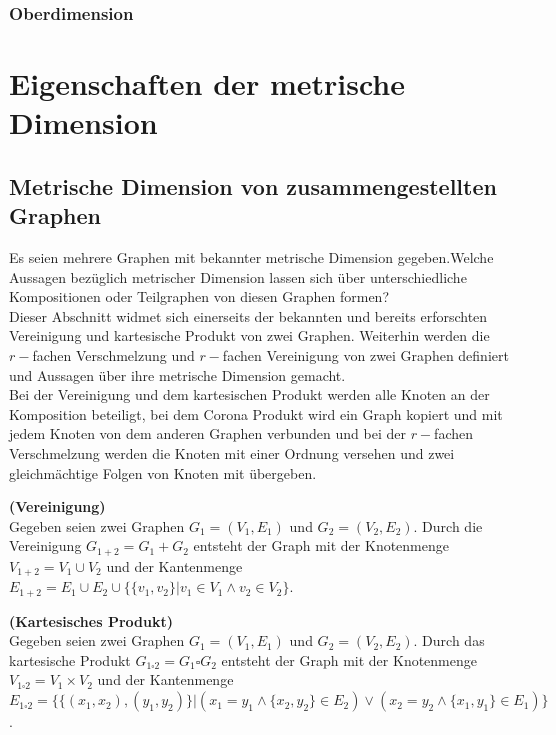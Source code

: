 \subsection{Oberdimension}


\chapter{Eigenschaften der metrische Dimension}
\section{Metrische Dimension von zusammengestellten Graphen}
\label{kapallg}
Es seien mehrere Graphen mit bekannter metrische Dimension gegeben.\newline Welche Aussagen bezüglich metrischer Dimension lassen sich über unterschiedliche Kompositionen oder Teilgraphen von diesen Graphen formen?\\Dieser Abschnitt widmet sich einerseits der bekannten und bereits erforschten Vereinigung und kartesische Produkt von zwei Graphen. Weiterhin werden die $r-$fachen Verschmelzung und $r-$fachen Vereinigung von zwei Graphen definiert und Aussagen über ihre metrische Dimension gemacht.\\Bei der Vereinigung und dem kartesischen Produkt werden alle Knoten an der Komposition beteiligt, bei dem Corona Produkt wird ein Graph kopiert und mit jedem Knoten von dem anderen Graphen verbunden und bei der $r-$fachen Verschmelzung werden die Knoten mit einer Ordnung versehen und zwei gleichmächtige Folgen von Knoten mit übergeben.   
\begin{defi}{\textbf{(Vereinigung)}}\\
Gegeben seien zwei Graphen $G_1=(V_1,E_1)$ und $G_2=(V_2,E_2)$. Durch die Vereinigung $G_{1+2}=G_1+G_2$ entsteht der Graph mit der Knotenmenge $V_{1+2}=V_1 \cup V_2$ und der Kantenmenge $E_{1+2}= E_1 \cup E_2 \cup \{\{v_1,v_2\}| v_1 \in V_1 \wedge v_2 \in V_2\}$.
\end{defi}

\begin{defi}{\textbf{(Kartesisches Produkt)}}\\
Gegeben seien zwei Graphen $G_1=(V_1,E_1)$ und $G_2=(V_2,E_2)$. Durch das kartesische Produkt $G_{1\square 2}=G_1 \square G_2$ entsteht der Graph mit der Knotenmenge $V_{1 \square 2}=V_1 \times V_2$ und der Kantenmenge $E_{1\square 2}= \{\{(x_1,x_2),(y_1,y_2)\}| (x_1=y_1 \wedge \{x_2,y_2\} \in E_2)\vee (x_2=y_2 \wedge \{x_1,y_1\} \in E_1)\}$. 
\end{defi}

